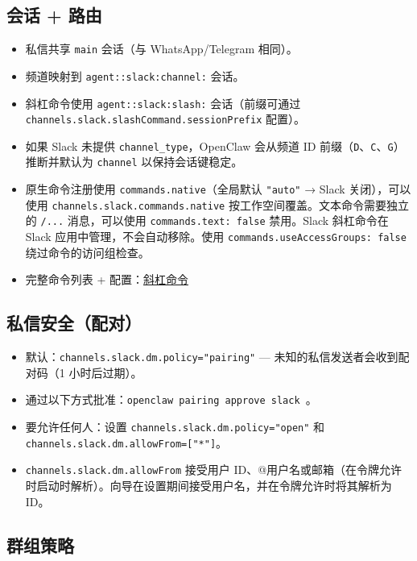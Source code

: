 \subsection{会话 + 路由}


\begin{itemize}
  \item 私信共享 \texttt{main} 会话（与 WhatsApp/Telegram 相同）。
  \item 频道映射到 \texttt{agent::slack:channel:} 会话。
  \item 斜杠命令使用 \texttt{agent::slack:slash:} 会话（前缀可通过 \texttt{channels.slack.slashCommand.sessionPrefix} 配置）。
  \item 如果 Slack 未提供 \texttt{channel\_type}，OpenClaw 会从频道 ID 前缀（\texttt{D}、\texttt{C}、\texttt{G}）推断并默认为 \texttt{channel} 以保持会话键稳定。
  \item 原生命令注册使用 \texttt{commands.native}（全局默认 \texttt{"auto"} → Slack 关闭），可以使用 \texttt{channels.slack.commands.native} 按工作空间覆盖。文本命令需要独立的 \texttt{/...} 消息，可以使用 \texttt{commands.text: false} 禁用。Slack 斜杠命令在 Slack 应用中管理，不会自动移除。使用 \texttt{commands.useAccessGroups: false} 绕过命令的访问组检查。
  \item 完整命令列表 + 配置：\href{/tools/slash-commands}{斜杠命令}
\end{itemize}


\subsection{私信安全（配对）}


\begin{itemize}
  \item 默认：\texttt{channels.slack.dm.policy="pairing"} — 未知的私信发送者会收到配对码（1 小时后过期）。
  \item 通过以下方式批准：\texttt{openclaw pairing approve slack }。
  \item 要允许任何人：设置 \texttt{channels.slack.dm.policy="open"} 和 \texttt{channels.slack.dm.allowFrom=["*"]}。
  \item \texttt{channels.slack.dm.allowFrom} 接受用户 ID、@用户名或邮箱（在令牌允许时启动时解析）。向导在设置期间接受用户名，并在令牌允许时将其解析为 ID。
\end{itemize}


\subsection{群组策略}


